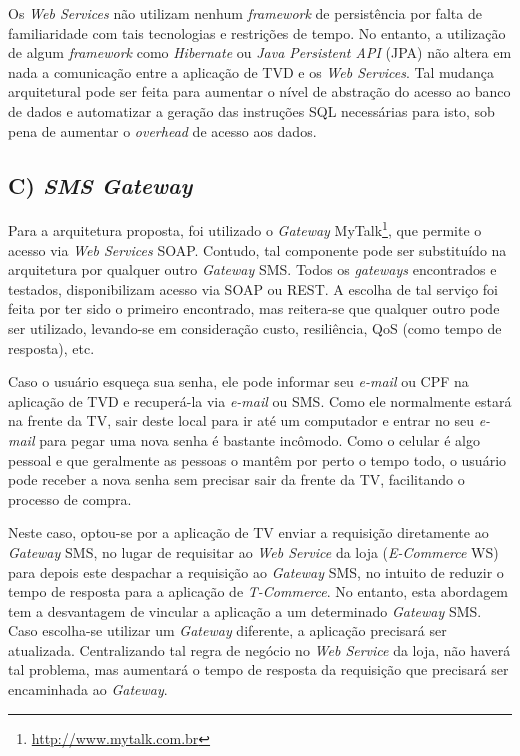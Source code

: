 Os \textit{Web Services} não utilizam nenhum \textit{framework} de persistência por falta
de familiaridade com tais tecnologias e restrições de tempo. No entanto,
a utilização de algum \textit{framework} como \textit{Hibernate} ou \textit{Java Persistent API} (JPA)
não altera em nada a comunicação entre a aplicação de TVD e os \textit{Web Services}.
Tal mudança arquitetural pode ser feita para aumentar o nível de abstração
do acesso ao banco de dados e automatizar a geração das instruções
SQL necessárias para isto, sob pena de aumentar o \textit{overhead} de acesso aos dados.

\subsection*{C) \textit{SMS Gateway}}

Para a arquitetura proposta, foi utilizado o \textit{Gateway} MyTalk\footnote{\url{http://www.mytalk.com.br}},
que permite o acesso via \textit{Web Services} SOAP. Contudo, tal componente
pode ser substituído na arquitetura por qualquer outro \textit{Gateway} SMS.
Todos os \textit{gateways} encontrados e testados, disponibilizam acesso via SOAP ou REST.
A escolha de tal serviço foi feita por ter sido o primeiro encontrado,
mas reitera-se que qualquer outro pode ser utilizado, levando-se em consideração
custo, resiliência, QoS (como tempo de resposta), etc.

Caso o usuário esqueça sua senha, ele pode informar seu \textit{e-mail} ou CPF na aplicação 
de TVD e recuperá-la via \textit{e-mail} ou SMS. Como ele normalmente estará na frente da TV, sair
deste local para ir até um computador e entrar no seu \textit{e-mail} para pegar 
uma nova senha é bastante incômodo. Como o celular é algo pessoal e
que geralmente as pessoas o mantêm por perto o tempo todo, o usuário
pode receber a nova senha sem precisar sair da frente da TV,
facilitando o processo de compra.

Neste caso, optou-se por a aplicação de TV enviar a requisição diretamente
ao \textit{Gateway} SMS, no lugar de requisitar ao \textit{Web Service} da loja (\textit{E-Commerce} WS)
para depois este despachar a requisição ao \textit{Gateway} SMS, 
no intuito de reduzir o tempo de resposta para a aplicação de \textit{T-Commerce}.
No entanto, esta abordagem tem a desvantagem de vincular a aplicação
a um determinado \textit{Gateway} SMS. Caso escolha-se utilizar
um \textit{Gateway} diferente, a aplicação precisará ser atualizada.
Centralizando tal regra de negócio no \textit{Web Service} da loja, não haverá
tal problema, mas aumentará o tempo de resposta da requisição
que precisará ser encaminhada ao \textit{Gateway}.

